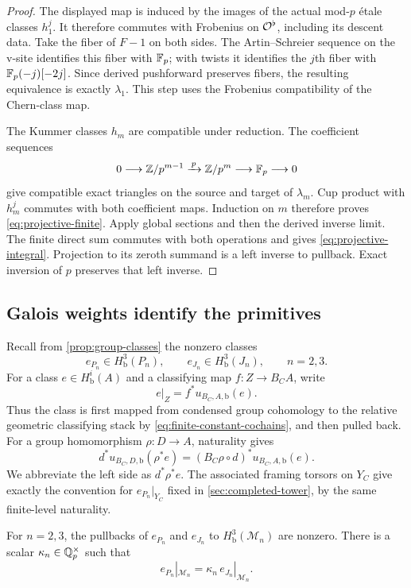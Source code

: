 \begin{proof}
The displayed map is induced by the images of the actual mod-$p$
\'etale classes $h_1^j$.  It therefore commutes with Frobenius on
$\mathcal O^\flat$, including its descent data.  Take the fiber of
$F-1$ on both sides.  The Artin--Schreier sequence on the v-site
identifies this fiber with $\mathbb F_p$; with twists it identifies the
$j$th fiber with $\mathbb F_p(-j)[-2j]$.
Since derived pushforward preserves fibers, the resulting equivalence
is exactly $\lambda_1$.
This step uses the Frobenius compatibility of the Chern-class map.

The Kummer classes $h_m$ are compatible under reduction.
The coefficient sequences
\[
 0\longrightarrow\mathbb Z/p^{m-1}\xrightarrow{\,p\,}\mathbb Z/p^m
       \longrightarrow\mathbb F_p\longrightarrow0
\]
give compatible exact triangles on the source and target of
$\lambda_m$.  Cup product with $h_m^j$ commutes with both coefficient
maps.  Induction on $m$ therefore proves
\cref{eq:projective-finite}.
Apply global sections and then the derived inverse limit.
The finite direct sum commutes with both operations and gives
\cref{eq:projective-integral}.  Projection to its zeroth summand
is a left inverse to pullback.  Exact inversion of $p$ preserves that
left inverse.
\end{proof}

\subsection{Galois weights identify the primitives}

Recall from \cref{prop:group-classes} the nonzero classes
\[
 e_{P_n}\in H^3_{\mathrm b}(P_n),\qquad
 e_{J_n}\in H^3_{\mathrm b}(J_n),\qquad n=2,3.
\]
For a class $e\in H^i_{\mathrm b}(A)$ and a classifying map
$f:Z\to B_CA$, write
\[
 e|_Z=f^*u_{B_C,A,\mathrm b}(e).
\]
Thus the class is first mapped from condensed group cohomology to the
relative geometric classifying stack by
\eqref{eq:finite-constant-cochains}, and then pulled back.  For a group
homomorphism $\rho:D\to A$, naturality gives
\[
 d^*u_{B_C,D,\mathrm b}(\rho^*e)
       =(B_C\rho\circ d)^*u_{B_C,A,\mathrm b}(e).
\]
We abbreviate the left side as $d^*\rho^*e$.  The associated framing
torsors on $Y_C$ give exactly the convention for $e_{P_n}|_{Y_C}$
fixed in \cref{sec:completed-tower}, by the same finite-level naturality.

\begin{proposition}\label{prop:primitive-comparison}
For $n=2,3$, the pullbacks of $e_{P_n}$ and $e_{J_n}$ to
$H^3_{\mathrm b}(\mathcal M_n)$ are nonzero.
There is a scalar $\kappa_n\in\mathbb Q_p^\times$ such that
\begin{equation}\label{eq:primitive-comparison}
 e_{P_n}|_{\mathcal M_n}
        =\kappa_n\,e_{J_n}|_{\mathcal M_n}.
\end{equation}
\end{proposition}

